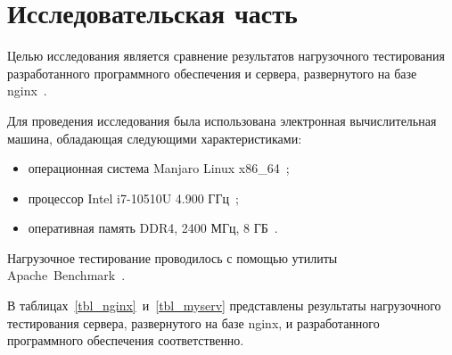 \chapter{Исследовательская часть}

Целью исследования является сравнение результатов нагрузочного тестирования разработанного программного обеспечения и сервера, развернутого на базе nginx~\cite{nginx}.

Для проведения исследования была использована электронная вычислительная машина, обладающая следующими характеристиками:
\begin{itemize}
	\item операционная система Manjaro Linux x86\_64~\cite{manjaro};
	\item процессор Intel i7-10510U 4.900 ГГц~\cite{cpu};
	\item оперативная память DDR4, 2400 МГц, 8 ГБ~\cite{ram}.
\end{itemize}

Нагрузочное тестирование проводилось с помощью утилиты Apache~Benchmark~\cite{ab}.

В таблицах~\ref{tbl_nginx}~и~\ref{tbl_myserv} представлены результаты нагрузочного тестирования сервера, развернутого на базе nginx, и разработанного программного обеспечения соответственно.

